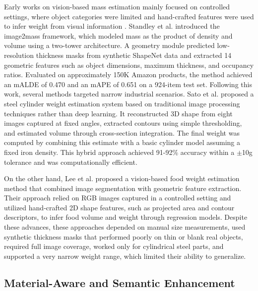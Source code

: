 \documentclass[journal,twoside,web]{ieeecolor}
\begin{document}
Early works on vision-based mass estimation mainly focused on controlled settings, where object categories were limited and hand-crafted features were used to infer weight from visual information \cite{standley2017image2mass,sato2024image,lee2025scalable}. Standley et al. \cite{standley2017image2mass} introduced the image2mass framework, which modeled mass as the product of density and volume using a two-tower architecture. A geometry module predicted low-resolution thickness masks from synthetic ShapeNet data and extracted 14 geometric features such as object dimensions, maximum thickness, and occupancy ratios. Evaluated on approximately 150K Amazon products, the method achieved an mALDE of 0.470 and an mAPE of 0.651 on a 924-item test set.  Following this work, several methods targeted narrow industrial scenarios. Sato et al. \cite{sato2024image} proposed a steel cylinder weight estimation system based on traditional image processing techniques rather than deep learning. It reconstructed 3D shape from eight images captured at fixed angles, extracted contours using simple thresholding, and estimated volume through cross-section integration. The final weight was computed by combining this estimate with a basic cylinder model assuming a fixed iron density. This hybrid approach achieved 91-92\% accuracy within a $\pm$10g tolerance and was computationally efficient. 

On the other hand, Lee et al. \cite{lee2025scalable} proposed a vision-based food weight estimation method that combined image segmentation with geometric feature extraction. Their approach relied on RGB images captured in a controlled setting and utilized hand-crafted 2D shape features, such as projected area and contour descriptors, to infer food volume and weight through regression models. Despite these advances, these approaches depended on manual size measurements, used synthetic thickness masks that performed poorly on thin or blank real objects, required full image coverage, worked only for cylindrical steel parts, and supported a very narrow weight range, which limited their ability to generalize.

\subsection{Material-Aware and Semantic Enhancement}
\end{document}
